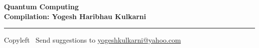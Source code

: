 
\graphicspath{{images/}}


\footnotesize


\begin{center}
\Large{\textbf{Quantum Computing\\ Compilation: Yogesh Haribhau Kulkarni}}  
\end{center}

\begin{multicols}{2}

\end{multicols}

\rule{\linewidth}{0.25pt}
\scriptsize
Copyleft \textcopyleft\  Send suggestions to 
\href{http://www.yogeshkulkarni.com}{yogeshkulkarni@yahoo.com}


